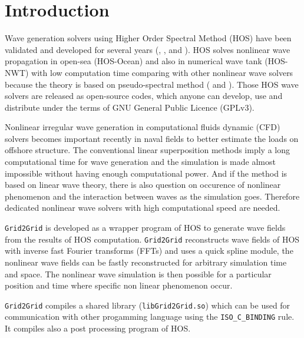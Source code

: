 \pagebreak
\section{Introduction}

Wave generation solvers using Higher Order Spectral Method (HOS) have been validated and developed for several years (\cite{ducrozet2016}, \cite{ducrozet2007}, \cite{bonnefoy2011} and \cite{ducrozet2012}). HOS solves nonlinear wave propagation in open-sea (HOS-Ocean) and also in numerical wave tank (HOS-NWT) with low computation time comparing with other nonlinear wave solvers because the theory is based on pseudo-spectral method (\cite{HOSOcean} and \cite{HOSNWT}). Those HOS wave solvers are released as open-source codes, which anyone can develop, use and distribute under the terms of GNU General Public Licence (GPLv3).

Nonlinear irregular wave generation in computational fluids dynamic (CFD) solvers becomes important recently in naval fields to better estimate the loads on offshore structure. The conventional linear superposition methods imply a long computational time for wave generation and the simulation is made almost impossible without having enough computational power. And if the method is based on linear wave theory, there is also question on occurence of nonlinear phenomenon and the interaction between waves as the simulation goes. Therefore dedicated nonlinear wave solvers with high computational speed are needed.

\texttt{Grid2Grid} is developed as a wrapper program of HOS to generate wave fields from the results of HOS computation. \texttt{Grid2Grid} reconstructs wave fields of HOS with inverse fast Fourier transforms (FFTs) and uses a quick spline module, the nonlinear wave fields can be fastly reconstructed for arbitrary simulation time and space. The nonlinear wave simulation is then possible for a particular position and time where specific non linear phenomenon occur.

\texttt{Grid2Grid} compiles a shared library (\texttt{libGrid2Grid.so}) which can be used for communication with other progamming language using the \texttt{ISO\_C\_BINDING} rule. It compiles also a post processing program of HOS. 

